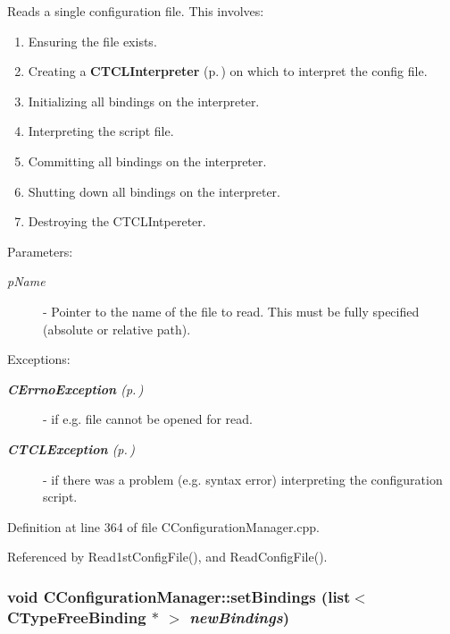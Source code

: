 Reads a single configuration file. This involves:\begin{enumerate}
\item 
Ensuring the file exists.\item 
Creating a {\bf CTCLInterpreter} {\rm (p.\,\pageref{classCTCLInterpreter})} on which to interpret the config file.\item 
Initializing all bindings on the interpreter.\item 
Interpreting the script file.\item 
Committing all bindings on the interpreter.\item 
Shutting down all bindings on the interpreter.\item 
Destroying the CTCLIntpereter.\end{enumerate}
\begin{Desc}
\item[Parameters: ]\par
\begin{description}
\item[{\em 
p\-Name}]- Pointer to the name of the file to read. This must be fully specified (absolute or relative path).\end{description}
\end{Desc}
\begin{Desc}
\item[Exceptions: ]\par
\begin{description}
\item[{\em 
{\bf CErrno\-Exception} {\rm (p.\,\pageref{classCErrnoException})}}] - if e.g. file cannot be opened for read. \item[{\em 
{\bf CTCLException} {\rm (p.\,\pageref{classCTCLException})}}] - if there was a problem (e.g. syntax error) interpreting the configuration script. \end{description}
\end{Desc}


Definition at line 364 of file CConfiguration\-Manager.cpp.

Referenced by Read1st\-Config\-File(), and Read\-Config\-File().
\subsubsection{\setlength{\rightskip}{0pt plus 5cm}void CConfiguration\-Manager::set\-Bindings (list$<$ {\bf CType\-Free\-Binding} $\ast$ $>$ {\em new\-Bindings})\hspace{0.3cm}{\tt  [inline]}}\label{classCConfigurationManager_a8}


